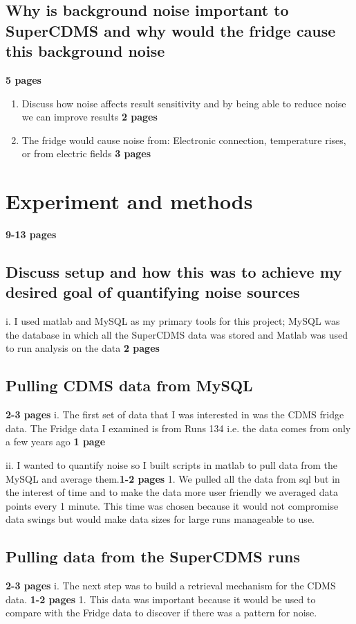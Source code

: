 \subsection{Why is background noise important to SuperCDMS and why would the fridge cause this background noise} \textbf{5 pages}

\begin{enumerate} 
  \item	Discuss how noise affects result sensitivity and by being able to reduce noise we can improve results \textbf{2 pages}

  \item The fridge would cause noise from: Electronic connection, temperature rises, or from electric fields \textbf{3 pages}
\end{enumerate} 

\section{Experiment and methods} \textbf{9-13 pages}

\subsection{Discuss setup and how this was to achieve my desired goal of quantifying noise sources}
i.	I used matlab and MySQL as my primary tools for this project; MySQL was the database in which all the SuperCDMS data was stored and Matlab was used to run analysis on the data \textbf{2 pages}

\subsection{Pulling CDMS data from MySQL} \textbf{2-3 pages}
i.	The first set of data that I was interested in was the CDMS fridge data. The Fridge data I examined is from Runs 134 i.e. the data comes from only a few years ago \textbf{1 page}

ii.	I wanted to quantify noise so I built scripts in matlab to pull data from the MySQL and average them.\textbf{1-2 pages}
1.	We pulled all the data from sql but in the interest of time and to make the data more user friendly we averaged data points every 1 minute. This time was chosen because it would not compromise data swings but would make data sizes for large runs manageable to use.

\subsection{Pulling data from the SuperCDMS runs} \textbf{2-3 pages}
i.	The next step was to build a retrieval mechanism for the CDMS data. \textbf{1-2 pages}
1.	This data was important because it would be used to compare with the Fridge data to discover if there was a pattern for noise.


